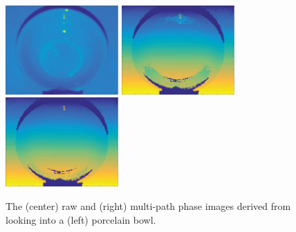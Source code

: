 \documentclass[10pt]{article}
\begin{document}
\begin{figure}[!t]
	\centering\includegraphics[width=1.70in]{Figures/figure15}
	\centering\includegraphics[width=1.70in]{Figures/figure14}
	\centering\includegraphics[width=1.70in]{Figures/figure13}
	\caption{The (center) raw and (right) multi-path phase images derived from looking into a (left) porcelain bowl.}
	\label{bowl}
\end{figure}
\end{document}
